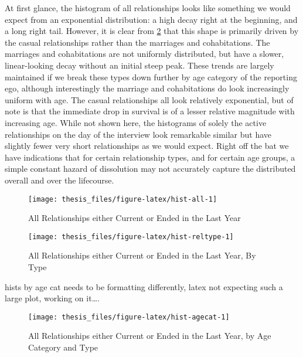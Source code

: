 \documentclass [11pt, proquest] {uwthesis}[2015/03/03]
\begin{document}
At first glance, the histogram of all relationships looks like something
we would expect from an exponential distribution: a high decay right at
the beginning, and a long right tail. However, it is clear from
\ref{fig:hist-reltype} that this shape is primarily driven by the casual
relationships rather than the marriages and cohabitations. The marriages
and cohabitations are not uniformly distributed, but have a slower,
linear-looking decay without an initial steep peak. These trends are
largely maintained if we break these types down further by age category
of the reporting ego, although interestingly the marriage and
cohabitations do look increasingly uniform with age. The casual
relationships all look relatively exponential, but of note is that the
immediate drop in survival is of a lesser relative magnitude with
increasing age. While not shown here, the histograms of solely the
active relationships on the day of the interview look remarkable similar
but have slightly fewer very short relationships as we would expect.
Right off the bat we have indications that for certain relationship
types, and for certain age groups, a simple constant hazard of
dissolution may not accurately capture the distributed overall and over
the lifecourse.
\begin{figure}

{\centering \texttt{[image: thesis\_files/figure-latex/hist-all-1]} 

}

\caption{All Relationships either Current or Ended in the Last Year}\label{fig:hist-all}
\end{figure}
\begin{figure}

{\centering \texttt{[image: thesis\_files/figure-latex/hist-reltype-1]} 

}

\caption{All Relationships either Current or Ended in the Last Year, By Type}\label{fig:hist-reltype}
\end{figure}
hists by age cat needs to be formatting differently, latex not expecting
such a large plot, working on it\ldots{}.
\begin{figure}

{\centering \texttt{[image: thesis\_files/figure-latex/hist-agecat-1]} 

}

\caption{All Relationships either Current or Ended in the Last Year, by Age Category and Type}\label{fig:hist-agecat}
\end{figure}
\end{document}
